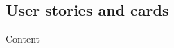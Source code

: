 \begin{appendices}
\chapter{User stories and cards}\label{ap:userstories}
Content
\end{appendices}

